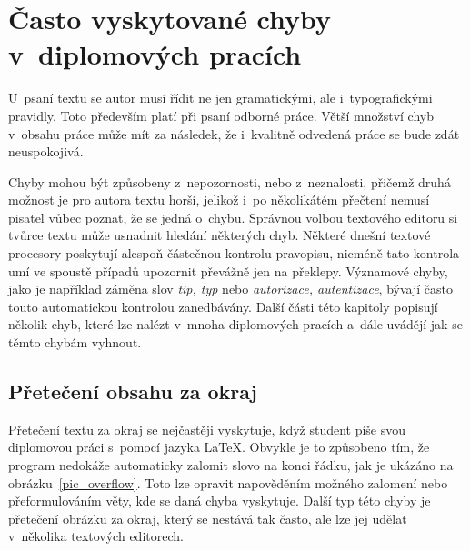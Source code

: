 



\chapter{Často vyskytované chyby v~diplomových pracích}
U~psaní textu se autor musí řídit ne jen gramatickými, ale i~typografickými
pravidly. Toto především platí při psaní odborné práce. Větší množství chyb
v~obsahu práce může mít za následek, že i~kvalitně odvedená práce se bude zdát
neuspokojivá.

Chyby mohou být způsobeny z~nepozornosti, nebo z~neznalosti, přičemž druhá možnost
je pro autora textu horší, jelikož i~po několikátém přečtení nemusí pisatel vůbec
poznat, že se jedná o~chybu. Správnou volbou textového editoru si tvůrce textu
může usnadnit hledání některých chyb. Některé dnešní textové procesory poskytují
alespoň částečnou kontrolu pravopisu, nicméně tato kontrola umí ve spoustě případů
upozornit převážně jen na překlepy. Významové chyby, jako je například záměna slov
\emph{tip, typ} nebo \emph{autorizace, autentizace}, bývají často touto
automatickou kontrolou zanedbávány. Další části této kapitoly popisují několik
chyb, které lze nalézt v~mnoha diplomových pracích a~dále uvádějí jak se těmto
chybám vyhnout.


\section{Přetečení obsahu za okraj}
Přetečení textu za okraj se nejčastěji vyskytuje, když student píše svou diplomovou
práci s~pomocí jazyka {\LaTeX}. Obvykle je to způsobeno tím, že program nedokáže
automaticky zalomit slovo na konci řádku, jak je ukázáno na
obrázku~\ref{pic_overflow}. Toto lze opravit napověděním možného
zalomení nebo přeformulováním věty, kde se daná chyba vyskytuje.
Další typ této chyby je přetečení obrázku za okraj,
který se nestává tak často, ale lze jej udělat v~několika textových editorech.


